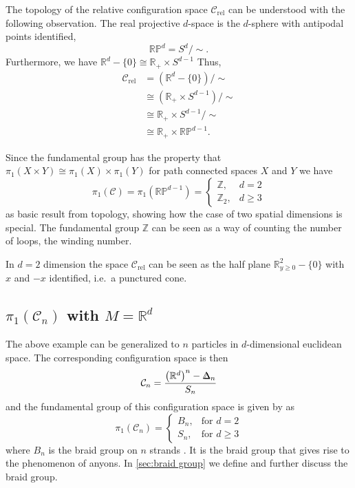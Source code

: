 \documentclass[a4paper,10pt,oneside]{book}
\theoremstyle{plain}
\theoremstyle{definition}
\theoremstyle{remark}
\newcommand{\Z}{\mathbb{Z}}
\newcommand{\R}{\mathbb{R}}
\def\bbDelta{{%
\setbox0\hbox{$\Delta$}%
\rlap{\hbox to \wd0{\hss\scalebox{0.82}{$\Delta$}}}\box0
}}
\begin{document}
The topology of the relative configuration space $\mathcal{C}_\text{rel}$ can be understood with the following observation.
The real projective $d$-space is the $d$-sphere with antipodal points identified,
\begin{equation}
  \R\mathbb{P}^d = S^d/{\sim}.
\end{equation}
Furthermore, we have $\mathbb{R}^d-\{0\} \cong \mathbb{R}_+ \times S^{d-1}$ Thus,
\begin{equation}
  \begin{aligned}
    \mathcal{C}_\text{rel}
    &= (\mathbb{R}^d - \{0\})/{\sim} \\
    &\cong (\mathbb{R}_+ \times S^{d-1})/{\sim} \\
    &\cong \mathbb{R}_+ \times S^{d-1}/{\sim} \\
    &\cong \mathbb{R}_+ \times \mathbb{RP}^{d-1}.
  \end{aligned}
\end{equation}

Since the fundamental group has the property that $π_1(X\times Y) \cong π_1(X) \times π_1(Y)$ for path connected spaces $X$ and $Y$ we have
\begin{equation}
  π_1(\mathcal{C}) = π_1(\R\mathbb{P}^{d-1}) =
  \begin{cases}
    \Z, & d = 2 \\
    \Z_2, & d \ge 3
  \end{cases}
\end{equation}
as basic result from topology, showing how the case of two spatial dimensions is special. The fundamental group $\mathbb{Z}$ can be seen as a way of counting the number of loops, the winding number.

In $d = 2$ dimension the space $\mathcal{C}_\text{rel}$ can be seen as the half plane $\R^2_{y \ge 0} - \{ 0 \}$ with $x$ and $-x$ identified, i.e.\ a punctured cone.






\subsection{\texorpdfstring{$\pi_1(\mathcal{C}_n)$ with $M = \mathbb{R}^d$}{π₁(Cₙ) with M = Rᵈ}}

The above example can be generalized to $n$ particles in $d$-dimensional euclidean space. The corresponding configuration space is then
\begin{equation}
  \mathcal{C}_n = \frac{\left(\mathbb{R}^d\right)^n - \bbDelta_n}{S_n}
\end{equation}
and the fundamental group of this configuration space is given by as
\begin{equation}
  π_1(\mathcal{C}_n) =
  \begin{cases}
    B_n, & \text{for $d = 2$} \\
    S_n, & \text{for $d \ge 3$}
  \end{cases}
\end{equation}
where $B_n$ is the braid group on $n$ strands \cite{fröhlich,khare}. It is the braid group that gives rise to the phenomenon of anyons. In \cref{sec:braid group} we define and further discuss the braid group.
\end{document}

